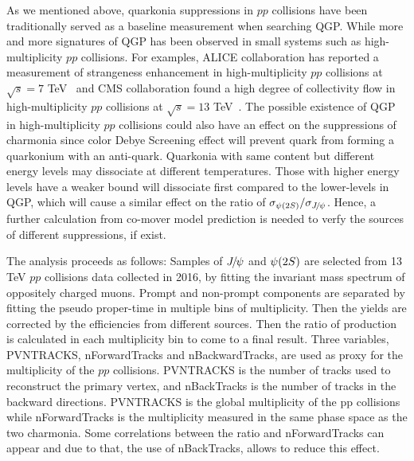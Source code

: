 As we mentioned above, quarkonia suppressions in $pp$ collisions have been traditionally served as a baseline measurement when searching QGP. While more and more signatures of QGP has been observed in small systems such as high-multiplicity $pp$ collisions. For examples, ALICE collaboration has reported a measurement of strangeness enhancement in high-multiplicity $pp$ collisions at $\sqrt{s}=7$ TeV~\cite{ALICE:2016fzo} and CMS collaboration found a high degree of collectivity flow in high-multiplicity $pp$ collisions at $\sqrt{s}=13$ TeV~\cite{CMS:2016fnw}. The possible existence of QGP in high-multiplicity $pp$ collisions could also have an effect on the suppressions of charmonia since color Debye Screening effect will prevent quark from forming a quarkonium with an anti-quark. Quarkonia with same content but different energy levels may dissociate at different temperatures. Those with higher energy levels have a weaker bound will dissociate first compared to the lower-levels in QGP, which will cause a similar effect on the ratio of $\sigma_{{\psi{(2S)}}}/\sigma_{{{J\mskip -3mu/\mskip -2mu\psi}}}$. Hence, a further calculation from co-mover model prediction is needed to verfy the sources of different suppressions, if exist.
    
The analysis proceeds as follows: Samples of ${{J\mskip -3mu/\mskip -2mu\psi}}$ and ${\psi{(2S)}}$ are selected from 13 TeV
$pp$ collisions data collected in 2016, by fitting the invariant mass spectrum of oppositely
charged muons. Prompt and non-prompt components are separated by fitting the pseudo
proper-time in multiple bins of multiplicity. Then the yields are corrected by the efficiencies
from different sources. Then the ratio of production is calculated in each multiplicity bin to
come to a final result. Three variables, PVNTRACKS, nForwardTracks and nBackwardTracks,
are used as proxy for the multiplicity of the $pp$ collisions. PVNTRACKS is the number of tracks
used to reconstruct the primary vertex, and nBackTracks is the number of tracks in the
backward directions. PVNTRACKS is the global multiplicity of the pp collisions while
nForwardTracks is the multiplicity measured in the same phase space as the two charmonia.
Some correlations between the ratio and nForwardTracks can appear and due to that, the
use of nBackTracks, allows to reduce this effect.

